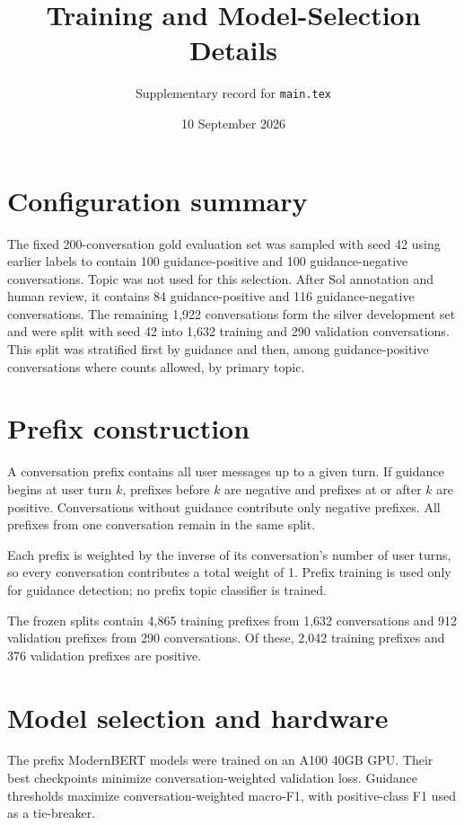 \documentclass[11pt]{article}
\title{Training and Model-Selection Details}
\author{Supplementary record for \texttt{main.tex}}
\date{10 September 2026}
\begin{document}
\maketitle

\section{Configuration summary}



The fixed 200-conversation gold evaluation set was sampled with seed 42 using earlier labels to contain 100 guidance-positive and 100 guidance-negative conversations. Topic was not used for this selection. After Sol annotation and human review, it contains 84 guidance-positive and 116 guidance-negative conversations. The remaining 1,922 conversations form the silver development set and were split with seed 42 into 1,632 training and 290 validation conversations. This split was stratified first by guidance and then, among guidance-positive conversations where counts allowed, by primary topic.

\section{Prefix construction}

A conversation prefix contains all user messages up to a given turn. If guidance begins at user turn $k$, prefixes before $k$ are negative and prefixes at or after $k$ are positive. Conversations without guidance contribute only negative prefixes. All prefixes from one conversation remain in the same split.

Each prefix is weighted by the inverse of its conversation's number of user turns, so every conversation contributes a total weight of 1. Prefix training is used only for guidance detection; no prefix topic classifier is trained.

The frozen splits contain 4,865 training prefixes from 1,632 conversations and 912 validation prefixes from 290 conversations. Of these, 2,042 training prefixes and 376 validation prefixes are positive.

\section{Model selection and hardware}

The prefix ModernBERT models were trained on an A100 40GB GPU. Their best checkpoints minimize conversation-weighted validation loss. Guidance thresholds maximize conversation-weighted macro-F1, with positive-class F1 used as a tie-breaker.
\end{document}

